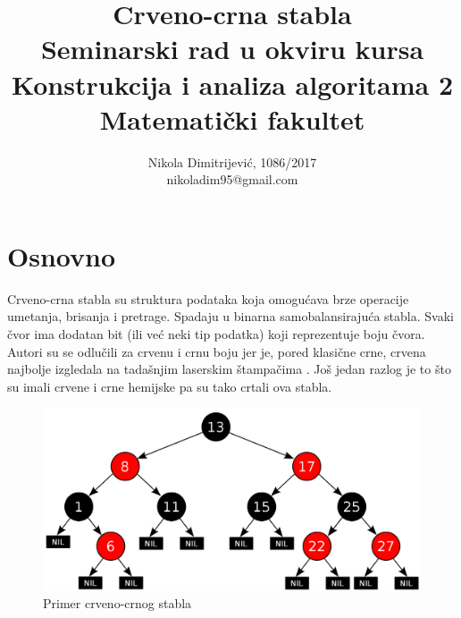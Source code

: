 \documentclass[a4paper]{article}
\begin{document}
\title{Crveno-crna stabla\\ \small{Seminarski rad u okviru kursa\\Konstrukcija i analiza algoritama 2\\ Matematički fakultet}}

\author{Nikola Dimitrijević, 1086/2017\\ nikoladim95@gmail.com}
\maketitle


\tableofcontents

\newpage

\section{Osnovno}
\label{sec:uvod}
Crveno-crna stabla su struktura podataka koja omogućava brze operacije umetanja, brisanja i pretrage. Spadaju u binarna samobalansirajuća stabla.
Svaki čvor ima dodatan bit (ili već neki tip podatka) koji reprezentuje boju čvora. Autori su se odlučili za crvenu i crnu boju jer je, pored klasične crne,
crvena najbolje izgledala na tadašnjim laserskim štampačima \cite{funfact}. Još jedan razlog je to što su imali crvene i crne hemijske pa su tako crtali ova stabla.

\begin{figure}[h!]
\begin{center}
\includegraphics[scale=0.2]{example.png}
\end{center}
\caption{Primer crveno-crnog stabla}
\label{fig:primer}
\end{figure}
\end{document}
